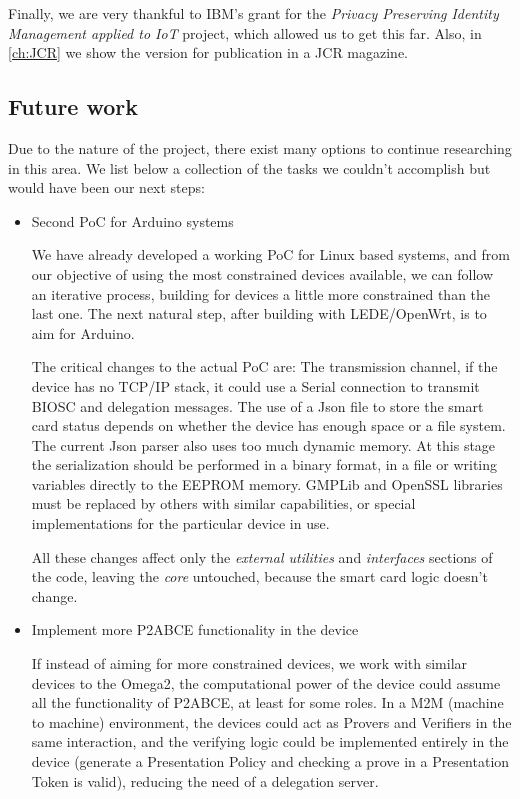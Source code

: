 \documentclass[journal]{IEEEtran}
\begin{document}
Finally, we are very thankful to IBM's grant for the \textit{Privacy Preserving Identity Management applied to IoT} project, which allowed us to get this far. Also, in \autoref{ch:JCR} we show the version for publication in a JCR magazine.


\subsection{Future work}


Due to the nature of the project, there exist many options to continue researching in this area. We list below a collection of the tasks we couldn't accomplish but would have been our next steps:

\begin{itemize}
	\item Second PoC for Arduino systems
	
	We have already developed a working PoC for Linux based systems, and from our objective of using the most constrained devices available, we can follow an iterative process, building for devices a little more constrained than the last one. The next natural step, after building with LEDE/OpenWrt, is to aim for Arduino.
	
	The critical changes to the actual PoC are: 
	\subitem The transmission channel, if the device has no TCP/IP stack, it could use a Serial connection to transmit BIOSC and delegation messages.
	\subitem The use of a Json file to store the smart card status depends on whether the device has enough space or a file system. The current Json parser also uses too much dynamic memory. At this stage the serialization should be performed in a binary format, in a file or writing variables directly to the EEPROM memory.
	\subitem GMPLib and OpenSSL libraries must be replaced by others with similar capabilities, or special implementations for the particular device in use.
	
	All these changes affect only the \textit{external utilities} and \textit{interfaces} sections of the code, leaving the \textit{core} untouched, because the smart card logic doesn't change.
	
	\item Implement more P2ABCE functionality in the device
	
	If instead of aiming for more constrained devices, we work with similar devices to the Omega2, the computational power of the device could assume all the functionality of P2ABCE, at least for some roles. In a M2M (machine to machine) environment, the devices could act as Provers and Verifiers in the same interaction, and the verifying logic could be implemented entirely in the device (generate a Presentation Policy and checking a prove in a Presentation Token is valid), reducing the need of a delegation server.
	

\end{itemize}
\end{document}

